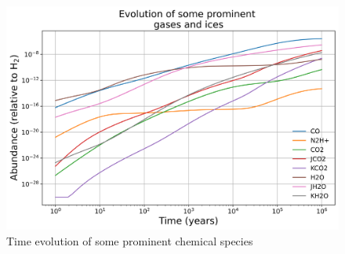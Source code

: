 \begin{figure}
	\centering
	\includegraphics[width=0.6\linewidth]{plot}
	\caption{Time evolution of some prominent chemical species}
	\label{fig:abun}
\end{figure}




 
 




